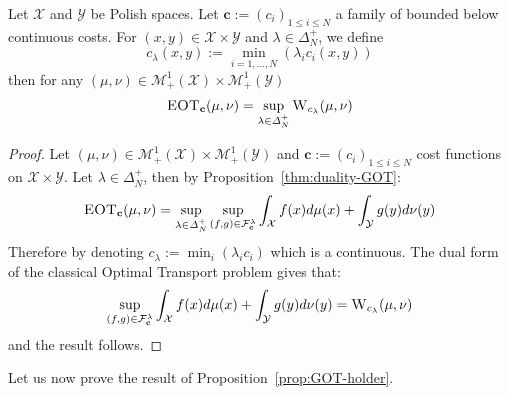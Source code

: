 \begin{lemma}
\label{lem:sup_wasser}
Let $\mathcal{X}$ and $\mathcal{Y}$ be Polish spaces. Let $\mathbf{c}:=(c_i)_{1\leq i\leq N}$ a family of bounded below continuous costs. For $(x,y)\in \mathcal{X}\times \mathcal{Y}$ and $\lambda\in\Delta_N^{+}$, we define 
$$c_\lambda(x,y):=\min_{i=1,...,N}(\lambda_i c_i(x,y))$$
then for any $(\mu,\nu)\in\mathcal{M}_+^{1}(\mathcal{X})\times\mathcal{M}_+^{1}(\mathcal{Y})$  
\begin{align}
    \textsc{EOT}_{\mathbf{c}}(\mu,\nu)=\sup_{\lambda\in\Delta_N^{+}} \textsc{W}_{c_\lambda}(\mu,\nu)
\end{align}
\end{lemma}

\begin{proof}
Let $(\mu,\nu)\in\mathcal{M}_+^{1}(\mathcal{X})\times\mathcal{M}_+^{1}(\mathcal{Y})$ and $\mathbf{c}:=(c_i)_{1\leq i\leq N}$ cost functions on $\mathcal{X}\times \mathcal{Y}$. Let $\lambda\in\Delta_N^{+}$, then by Proposition~\ref{thm:duality-GOT}:
\begin{align*}
    \textsc{EOT}_{\mathbf{c}}(\mu,\nu)= \sup_{\lambda\in\Delta_N^{+}} \sup_{(f,g)\in \mathcal{F}_{\mathbf{c}}^{\lambda}} \int_{\mathcal{X}} f(x)d\mu(x)+ \int_{\mathcal{Y}} g(y)d\nu(y)
\end{align*}
Therefore by denoting $c_\lambda:=\min_i(\lambda_ic_i)$ which is a continuous. The dual form of the classical Optimal Transport problem gives that:
\begin{align*}
\sup_{(f,g)\in \mathcal{F}_{\mathbf{c}}^{\lambda}} \int_{\mathcal{X}} f(x)d\mu(x)+ \int_{\mathcal{Y}} g(y)d\nu(y) =  \textsc{W}_{c_\lambda}(\mu,\nu)
\end{align*}
and the result follows.
\end{proof}


Let us now prove the result of Proposition~\ref{prop:GOT-holder}. 

